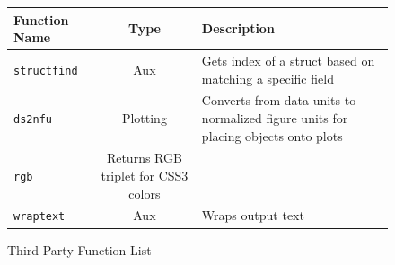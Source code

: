 \documentclass{article}
\begin{document}
\begin{figure}[h]
\caption{Third-Party Function List}
\begin{center}
\begin{tabular}{l c | p{3.5in}}
Function Name&Type&Description\\ \hline
\texttt{structfind}&Aux&Gets index of a struct based on matching a specific field\\
\texttt{ds2nfu}&Plotting&Converts from data units to normalized figure units for placing objects onto plots\\
\texttt{rgb}&Returns RGB triplet for CSS3 colors\\
\texttt{wraptext}&Aux&Wraps output text\\ 
\end{tabular}
\end{center}
\end{figure}
\end{document}
